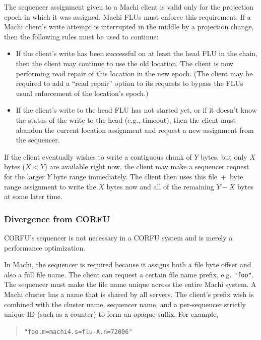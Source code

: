 \documentclass[preprint,10pt]{sigplanconf}
\begin{document}
The sequencer assignment given to a Machi client is valid only for the
projection epoch in which it was assigned.  Machi FLUs must enforce
this requirement.  If a Machi client's write attempt is interrupted in
the middle by a projection change, then the following rules must be
used to continue:

\begin{itemize}
\item If the client's write has been successful on at least the head
  FLU in the chain, then the client may continue to use the old
  location.  The client is now performing read repair of this location in
  the new epoch.  (The client may be required to add a ``read repair'' option
  to its requests to bypass the FLUs usual enforcement of the
  location's epoch.)
\item If the client's write to the head FLU has not started yet, or if
  it doesn't know the status of the write to the head (e.g., timeout),
  then the client must abandon the current location assignment and
  request a new assignment from the sequencer.
\end{itemize}

If the client eventually wishes to write a contiguous chunk of $Y$
bytes, but only $X$ bytes ($X < Y$) are available right now, the
client may make a sequencer request for the larger $Y$ byte range
immediately.  The client then uses this file~+~byte range assignment
to write the $X$ bytes now and all of the remaining $Y-X$ bytes at
some later time.

\subsubsection{Divergence from CORFU}
\label{sub:sequencer-divergence}

CORFU's sequencer is not
necessary in a CORFU system and is merely a performance optimization.  

In Machi, the sequencer is required because it assigns both a file
byte offset and also a full file name.  The client can request a
certain file name prefix, e.g. {\tt "foo"}.  The sequencer must make
the file name unique across the entire Machi system.  A Machi cluster
has a name that is shared by all servers.  The client's prefix
wish is combined with the cluster name, sequencer name, and a
per-sequencer strictly unique ID (such as a counter) to form an opaque
suffix.
For example,
\begin{quote}
{\tt "foo.m=machi4.s=flu-A.n=72006"}
\end{quote}
\end{document}
